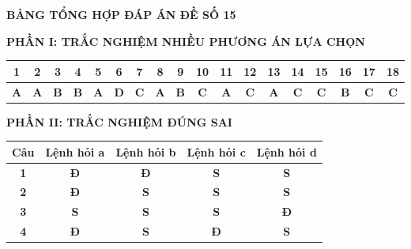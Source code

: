 \documentclass[11pt,a4paper]{article}
\begin{document}

\vspace{0.5cm}
\begin{center}
	\textbf{\Large\color{mainGreen}BẢNG TỔNG HỢP ĐÁP ÁN ĐỀ SỐ 15}
\end{center}

\vspace{0.2cm}
\noindent\textbf{\color{mainGreen}PHẦN I: TRẮC NGHIỆM NHIỀU PHƯƠNG ÁN LỰA CHỌN}
\begin{center}
\renewcommand{\arraystretch}{1.2}
\begin{tabular}{|c|c|c|c|c|c|c|c|c|c|c|c|c|c|c|c|c|c|}
\hline
\textbf{1} & \textbf{2} & \textbf{3} & \textbf{4} & \textbf{5} & \textbf{6} & \textbf{7} & \textbf{8} & \textbf{9} & \textbf{10} & \textbf{11} & \textbf{12} & \textbf{13} & \textbf{14} & \textbf{15} & \textbf{16} & \textbf{17} & \textbf{18} \\ \hline
\textbf{\color{red}A} & \textbf{\color{red}A} & \textbf{\color{red}B} & \textbf{\color{red}B} & \textbf{\color{red}A} & \textbf{\color{red}D} & \textbf{\color{red}C} & \textbf{\color{red}A} & \textbf{\color{red}B} & \textbf{\color{red}C} & \textbf{\color{red}A} & \textbf{\color{red}C} & \textbf{\color{red}A} & \textbf{\color{red}C} & \textbf{\color{red}C} & \textbf{\color{red}B} & \textbf{\color{red}C} & \textbf{\color{red}C} \\ \hline
\end{tabular}
\end{center}

\vspace{0.3cm}
\noindent\textbf{\color{mainGreen}PHẦN II: TRẮC NGHIỆM ĐÚNG SAI}
\begin{center}
\renewcommand{\arraystretch}{1.2}
\begin{tabular}{|c|c|c|c|c|}
\hline
\textbf{Câu} & \textbf{Lệnh hỏi a} & \textbf{Lệnh hỏi b} & \textbf{Lệnh hỏi c} & \textbf{Lệnh hỏi d} \\ \hline
\textbf{1} & \textbf{\color{red}Đ} & \textbf{\color{red}Đ} & \textbf{S} & \textbf{S} \\ \hline
\textbf{2} & \textbf{\color{red}Đ} & \textbf{S} & \textbf{S} & \textbf{S} \\ \hline
\textbf{3} & \textbf{S} & \textbf{S} & \textbf{S} & \textbf{\color{red}Đ} \\ \hline
\textbf{4} & \textbf{\color{red}Đ} & \textbf{S} & \textbf{\color{red}Đ} & \textbf{S} \\ \hline
\end{tabular}
\end{center}
\end{document}
